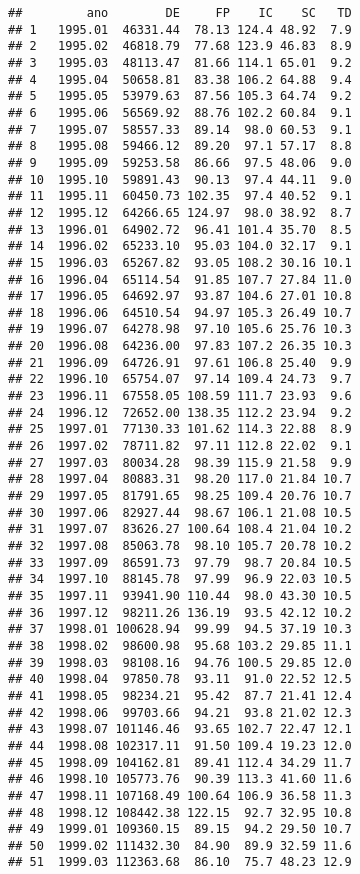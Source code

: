 \documentclass[]{article}
\begin{document}
\begin{verbatim}
##         ano        DE     FP    IC    SC   TD
## 1   1995.01  46331.44  78.13 124.4 48.92  7.9
## 2   1995.02  46818.79  77.68 123.9 46.83  8.9
## 3   1995.03  48113.47  81.66 114.1 65.01  9.2
## 4   1995.04  50658.81  83.38 106.2 64.88  9.4
## 5   1995.05  53979.63  87.56 105.3 64.74  9.2
## 6   1995.06  56569.92  88.76 102.2 60.84  9.1
## 7   1995.07  58557.33  89.14  98.0 60.53  9.1
## 8   1995.08  59466.12  89.20  97.1 57.17  8.8
## 9   1995.09  59253.58  86.66  97.5 48.06  9.0
## 10  1995.10  59891.43  90.13  97.4 44.11  9.0
## 11  1995.11  60450.73 102.35  97.4 40.52  9.1
## 12  1995.12  64266.65 124.97  98.0 38.92  8.7
## 13  1996.01  64902.72  96.41 101.4 35.70  8.5
## 14  1996.02  65233.10  95.03 104.0 32.17  9.1
## 15  1996.03  65267.82  93.05 108.2 30.16 10.1
## 16  1996.04  65114.54  91.85 107.7 27.84 11.0
## 17  1996.05  64692.97  93.87 104.6 27.01 10.8
## 18  1996.06  64510.54  94.97 105.3 26.49 10.7
## 19  1996.07  64278.98  97.10 105.6 25.76 10.3
## 20  1996.08  64236.00  97.83 107.2 26.35 10.3
## 21  1996.09  64726.91  97.61 106.8 25.40  9.9
## 22  1996.10  65754.07  97.14 109.4 24.73  9.7
## 23  1996.11  67558.05 108.59 111.7 23.93  9.6
## 24  1996.12  72652.00 138.35 112.2 23.94  9.2
## 25  1997.01  77130.33 101.62 114.3 22.88  8.9
## 26  1997.02  78711.82  97.11 112.8 22.02  9.1
## 27  1997.03  80034.28  98.39 115.9 21.58  9.9
## 28  1997.04  80883.31  98.20 117.0 21.84 10.7
## 29  1997.05  81791.65  98.25 109.4 20.76 10.7
## 30  1997.06  82927.44  98.67 106.1 21.08 10.5
## 31  1997.07  83626.27 100.64 108.4 21.04 10.2
## 32  1997.08  85063.78  98.10 105.7 20.78 10.2
## 33  1997.09  86591.73  97.79  98.7 20.84 10.5
## 34  1997.10  88145.78  97.99  96.9 22.03 10.5
## 35  1997.11  93941.90 110.44  98.0 43.30 10.5
## 36  1997.12  98211.26 136.19  93.5 42.12 10.2
## 37  1998.01 100628.94  99.99  94.5 37.19 10.3
## 38  1998.02  98600.98  95.68 103.2 29.85 11.1
## 39  1998.03  98108.16  94.76 100.5 29.85 12.0
## 40  1998.04  97850.78  93.11  91.0 22.52 12.5
## 41  1998.05  98234.21  95.42  87.7 21.41 12.4
## 42  1998.06  99703.66  94.21  93.8 21.02 12.3
## 43  1998.07 101146.46  93.65 102.7 22.47 12.1
## 44  1998.08 102317.11  91.50 109.4 19.23 12.0
## 45  1998.09 104162.81  89.41 112.4 34.29 11.7
## 46  1998.10 105773.76  90.39 113.3 41.60 11.6
## 47  1998.11 107168.49 100.64 106.9 36.58 11.3
## 48  1998.12 108442.38 122.15  92.7 32.95 10.8
## 49  1999.01 109360.15  89.15  94.2 29.50 10.7
## 50  1999.02 111432.30  84.90  89.9 32.59 11.6
## 51  1999.03 112363.68  86.10  75.7 48.23 12.9

\end{verbatim}
\end{document}
